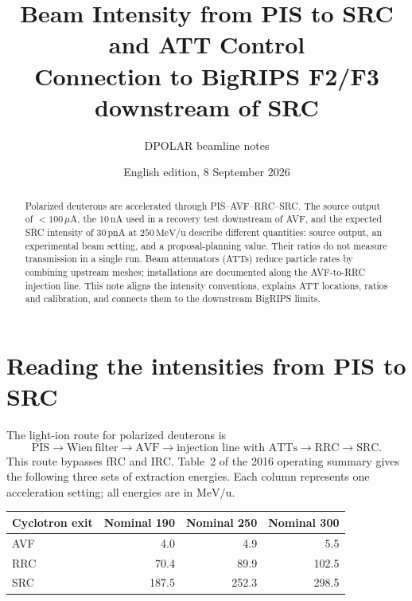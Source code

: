 \documentclass[11pt,a4paper]{article}
\title{Beam Intensity from PIS to SRC\\and ATT Control\\[4pt]\large Connection to BigRIPS F2/F3 downstream of SRC}
\author{DPOLAR beamline notes}
\date{English edition, 8 September 2026}
\begin{document}
\maketitle

\begin{abstract}
Polarized deuterons are accelerated through PIS--AVF--RRC--SRC. The source output of $<100\,\mu\mathrm{A}$, the $10\,\mathrm{nA}$ used in a recovery test downstream of AVF, and the expected SRC intensity of $30\,\mathrm{pnA}$ at $250\,\mathrm{MeV/u}$ describe different quantities: source output, an experimental beam setting, and a proposal-planning value. Their ratios do not measure transmission in a single run. Beam attenuators (ATTs) reduce particle rates by combining upstream meshes; installations are documented along the AVF-to-RRC injection line. This note aligns the intensity conventions, explains ATT locations, ratios and calibration, and connects them to the downstream BigRIPS limits.
\end{abstract}

\section{Reading the intensities from PIS to SRC}
\label{sec:pis-src}
The light-ion route for polarized deuterons is
\[
\mathrm{PIS}\to\mathrm{Wien\ filter}\to\mathrm{AVF}
\to\boxed{\text{injection line with ATTs}}\to\mathrm{RRC}\to\mathrm{SRC}.
\]
This route bypasses fRC and IRC. Table~2 of the 2016 operating summary gives the following three sets of extraction energies. Each column represents one acceleration setting; all energies are in $\mathrm{MeV/u}$.\cite{sakamoto2016}
\begin{center}
\begin{tabular}{lrrr}
\toprule
Cyclotron exit & Nominal 190 & Nominal 250 & Nominal 300 \\
\midrule
AVF & 4.0 & 4.9 & 5.5 \\
RRC & 70.4 & 89.9 & 102.5 \\
SRC & 187.5 & 252.3 & 298.5 \\
\bottomrule
\end{tabular}
\end{center}
\end{document}

